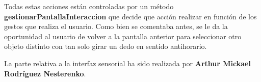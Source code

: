 \begin{itemize}
	Todas estas acciones están controladas por un método \textbf{gestionarPantallaInteraccion} que decide que acción realizar en función de los gestos que realiza el usuario. Como bien se comentaba antes, se le da la oportunidad al usuario de volver a la pantalla anterior para seleccionar otro objeto distinto con tan solo girar un dedo en sentido antihorario.
	\end{itemize}

La parte relativa a la interfaz sensorial ha sido realizada por \textbf{Arthur Mickael Rodríguez Nesterenko}.
\newpage






